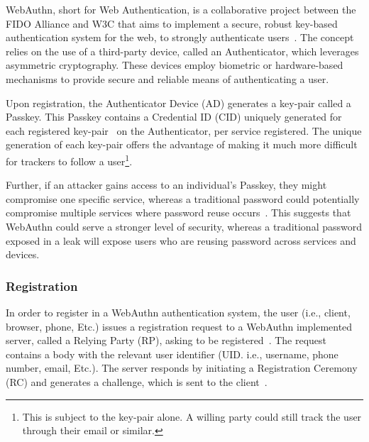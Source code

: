 
\newcommand{\credIdentifier}{\footnote{There is a requirement to check whether the credential identifier, generated by the Authenticator
device exsits on the server.
For further discussions on this topic, see section \hyperref[sec:futurework]{Future work}}}

\newcommand{\navigatorApi}{\footnote{In LessPM's case, this is the \textit{navigator.credentials} API provided by the browser.}}


WebAuthn, short for Web Authentication, is a collaborative project between the
FIDO Alliance and W3C that aims to implement a secure, robust key-based
authentication system for the web, to strongly authenticate users~\cite{webauthn_level_2}.
The concept relies on the use of a third-party device, called an Authenticator,
which leverages asymmetric cryptography.
These devices employ biometric or hardware-based mechanisms to provide secure
and reliable means of authenticating a user.

Upon registration, the Authenticator Device (AD) generates a key-pair called a
Passkey.
This Passkey contains a Credential ID (CID) uniquely generated for each
registered key-pair~\cite{webauthn_credential_id,webauthn_public_key_credential}
on the Authenticator, per service registered.
The unique generation of each key-pair offers the advantage of making it much
more difficult for trackers to follow a user\footnote{
  This is subject to the key-pair alone. A willing party could still track the
  user through their email or similar.
}.

Further, if an attacker gains access to an individual's Passkey, they might
compromise one specific service, whereas a traditional password could
potentially compromise multiple services where password reuse
occurs~\cite{wang2018next}.
This suggests that WebAuthn could serve a stronger level of security, whereas
a traditional password exposed in a leak will expose users who are reusing
password across services and devices.

\subsubsection{Registration}\label{subsubsec:registration}
In order to register in a WebAuthn authentication system, the user (i.e.,
client, browser, phone, Etc.) issues a registration request to a
WebAuthn implemented server, called a Relying Party (RP), asking to be
registered~\cite{webauthn-2-rp}.
The request contains a body with the relevant user identifier (UID. i.e.,
username, phone number, email, Etc.).
The server responds by initiating a Registration Ceremony (RC) and generates a
challenge, which is sent to the client~\cite{webauthn-2}.

